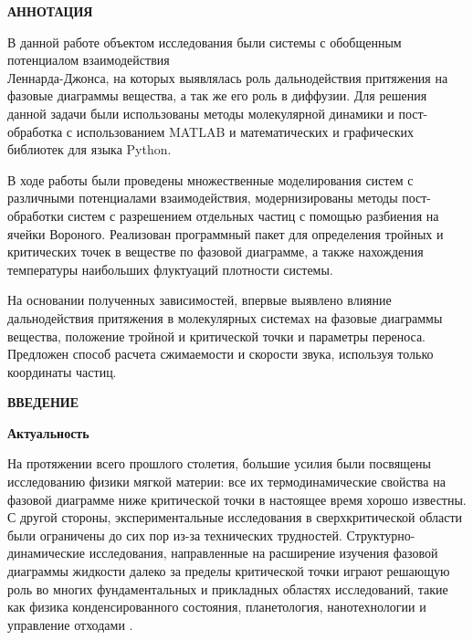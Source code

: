 
\newpage
\begin{center}
\textbf{АННОТАЦИЯ}
\end{center}

В данной работе объектом исследования были системы с обобщенным потенциалом взаимодействия \\ Леннарда-Джонса, на которых выявлялась роль дальнодействия притяжения на фазовые диаграммы вещества, а так же его роль в диффузии. Для решения данной задачи были использованы методы молекулярной динамики и пост-обработка с использованием MATLAB и математических и графических библиотек для языка Python.

 В ходе работы были проведены множественные моделирования систем с различными потенциалами взаимодействия, модернизированы методы пост-обработки систем с разрешением отдельных частиц с помощью разбиения на ячейки Вороного. Реализован программный пакет для определения тройных и критических точек в веществе по фазовой диаграмме, а также нахождения температуры наибольших флуктуаций плотности системы.
 
 На основании полученных зависимостей, впервые выявлено влияние дальнодействия притяжения в молекулярных системах на фазовые диаграммы вещества, положение тройной и критической точки и параметры переноса. Предложен способ расчета сжимаемости и скорости звука, используя только координаты частиц.


\onehalfspacing
\setcounter{page}{2}
\renewcommand{\contentsname}{\centerline{\Large{Cодержание}}}
\tableofcontents
{}
\renewcommand{\contentsname}{\centerline{\Large{Cодержание}}}

\newpage
\begin{center}
\textbf{ВВЕДЕНИЕ}
\end{center}



\textbf{Актуальность}

На протяжении всего прошлого столетия, большие усилия были посвящены исследованию физики
мягкой материи: все их термодинамические свойства на фазовой диаграмме ниже критической точки в настоящее время хорошо известны. С другой стороны, экспериментальные исследования в сверхкритической области были ограничены
до сих пор из-за технических трудностей.
Структурно-динамические исследования, направленные на расширение изучения фазовой диаграммы жидкости
далеко за пределы критической точки играют решающую роль во многих фундаментальных
и прикладных областях исследований, такие как физика конденсированного состояния, планетология, нанотехнологии и управление отходами \cite{WL3}.

